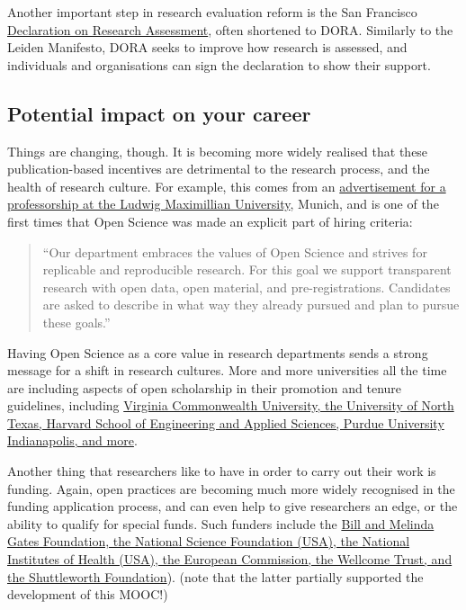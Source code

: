 \documentclass[]{book}
\begin{document}
Another important step in research evaluation reform is the San Francisco \href{https://sfdora.org/}{Declaration on Research Assessment}, often shortened to DORA. Similarly to the Leiden Manifesto, DORA seeks to improve how research is assessed, and individuals and organisations can sign the declaration to show their support.

\hypertarget{potential-impact-on-your-career}{%
\subsection{Potential impact on your career }\label{potential-impact-on-your-career}}

Things are changing, though. It is becoming more widely realised that these publication-based incentives are detrimental to the research process, and the health of research culture. For example, this comes from an \href{http://www.nicebread.de/open-science-hiring-practices/}{advertisement for a professorship at the Ludwig Maximillian University}, Munich, and is one of the first times that Open Science was made an explicit part of hiring criteria:

\begin{quote}
``Our department embraces the values of Open Science and strives for replicable and reproducible research. For this goal we support transparent research with open data, open material, and pre-registrations. Candidates are asked to describe in what way they already pursued and plan to pursue these goals.''
\end{quote}

Having Open Science as a core value in research departments sends a strong message for a shift in research cultures. More and more universities all the time are including aspects of open scholarship in their promotion and tenure guidelines, including \href{http://whyopenresearch.org/promotion}{Virginia Commonwealth University, the University of North Texas, Harvard School of Engineering and Applied Sciences, Purdue University Indianapolis, and more}.

Another thing that researchers like to have in order to carry out their work is funding. Again, open practices are becoming much more widely recognised in the funding application process, and can even help to give researchers an edge, or the ability to qualify for special funds. Such funders include the \href{http://whyopenresearch.org/funding}{Bill and Melinda Gates Foundation, the National Science Foundation (USA), the National Institutes of Health (USA), the European Commission, the Wellcome Trust, and the Shuttleworth Foundation}). (note that the latter partially supported the development of this MOOC!)
\end{document}
